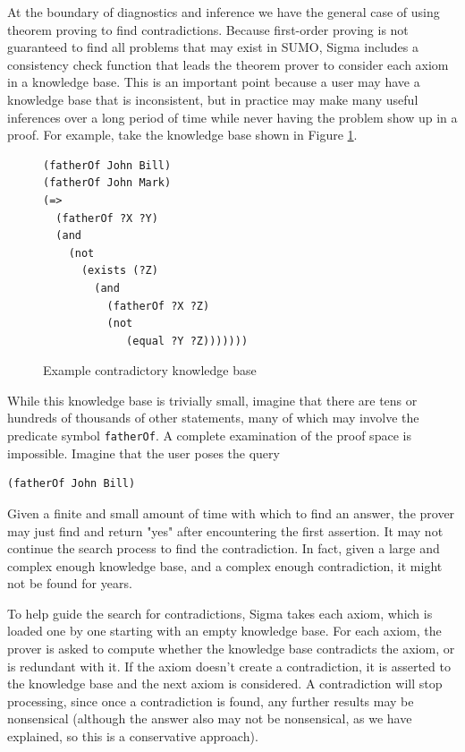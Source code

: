 \documentclass{book}
\begin{document}
At the boundary of diagnostics and inference we have the general case of using
theorem proving to find contradictions.  Because first-order proving is not
guaranteed to find all problems that may exist in SUMO, Sigma includes a
consistency check function that leads the theorem prover to consider each axiom
in a knowledge base. This is an important point because a user may have a
knowledge base that is inconsistent, but in practice may make many useful
inferences over a long period of time while never having the problem show up in
a proof. For example, take the knowledge base shown in Figure \ref{fig:ContKB}.

\begin{figure}
\begin{framed}
\begin{verbatim}
(fatherOf John Bill)
(fatherOf John Mark)
(=>
  (fatherOf ?X ?Y)
  (and 
    (not  
      (exists (?Z)
        (and
          (fatherOf ?X ?Z)
          (not 
             (equal ?Y ?Z)))))))
\end{verbatim}
\caption{Example contradictory knowledge base}
\label{fig:ContKB}
\end{framed}
\end{figure}

While this knowledge base is trivially small, imagine that there are tens or
hundreds of thousands of other statements, many of which may involve the
predicate symbol {\tt fatherOf}.  A complete examination of the proof space is
impossible.  Imagine that the user poses the query

\begin{verbatim}
(fatherOf John Bill)
\end{verbatim}

Given a finite and small amount of time with which to find an answer, the prover
may just find and return "yes" after encountering the first assertion.  It may
not continue the search process to find the contradiction.  In fact, given a
large and complex enough knowledge base, and a complex enough contradiction, it
might not be found for years.

To help guide the search for contradictions, Sigma takes each axiom, which is
loaded one by one starting with an empty knowledge base.  For each axiom, the
prover is asked to compute whether the knowledge base contradicts the axiom, or
is redundant with it.  If the axiom doesn't create a contradiction, it is
asserted to the knowledge base and the next axiom is considered.  A
contradiction will stop processing, since once a contradiction is found, any
further results may be nonsensical (although the answer also may not be
nonsensical, as we have explained, so this is a conservative approach).
\end{document}
